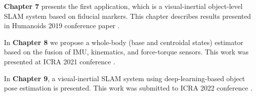 \bigskip
\textbf{Chapter 7} presents the first application, which is a visual-inertial object-level SLAM system based on fiducial markers. This chapter describes
results presented in Humanoids 2019 conference paper \cite{fourmy2019absolute}.

\bigskip
In \textbf{Chapter 8} we propose a whole-body (base and centroidal states) estimator based on the fusion of IMU, kinematics, and force-torque sensors. This
work was presented at ICRA 2021 conference \cite{fourmy2021contact}.

\bigskip
In \textbf{Chapter 9}, a visual-inertial SLAM system using deep-learning-based object pose estimation is presented. This work was submitted to ICRA 2022 conference 
\cite{debeunne2021cosyslam}.





